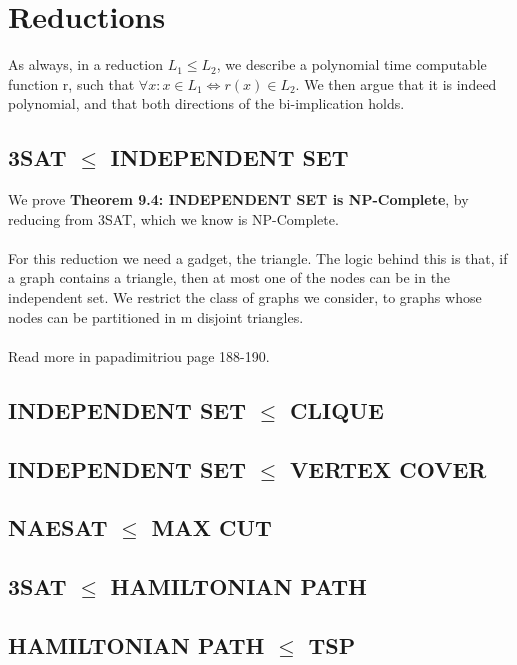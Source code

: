 \documentclass{article}
\begin{document}
\section{Reductions}
As always, in a reduction $L_1 \le L_2$, we describe a polynomial time computable function r, such that $\forall x: x\in L_1 \iff r(x) \in L_2$. We then argue that it is indeed polynomial, and that both directions of the bi-implication holds.
\subsection{3SAT $\le$ INDEPENDENT SET}
We prove \textbf{Theorem 9.4: INDEPENDENT SET is NP-Complete}, by reducing from 3SAT, which we know is NP-Complete.\\\\
For this reduction we need a gadget, the triangle. The logic behind this is that, if a graph contains a triangle, then at most one of the nodes can be in the independent set. We restrict the class of graphs we consider, to graphs whose nodes can be partitioned in m disjoint triangles. 
\\\\
Read more in papadimitriou page 188-190.
\subsection{INDEPENDENT SET $\le$ CLIQUE}
\subsection{INDEPENDENT SET $\le$ VERTEX COVER}
\subsection{NAESAT $\le$ MAX CUT}
\subsection{3SAT $\le$ HAMILTONIAN PATH}
\subsection{HAMILTONIAN PATH $\le$ TSP}
\end{document}
